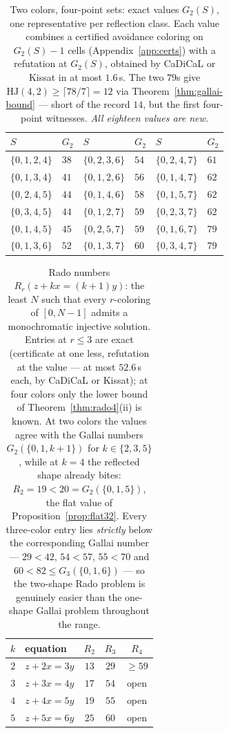 \documentclass[12pt]{article}
\newcommand{\HJ}{\mathrm{HJ}}
\begin{document}
\begin{table}[ht]
\centering
\caption{Two colors, four-point sets: exact values $G_{2}(S)$, one
representative per reflection class. Each value combines a certified
avoidance coloring on $G_{2}(S)-1$ cells (Appendix~\ref{app:certs})
with a refutation at $G_{2}(S)$, obtained by CaDiCaL or Kissat in at
most $1.6$\,s. The two $79$s give
$\HJ(4,2)\ge\lceil 78/7\rceil=12$ via
Theorem~\ref{thm:gallai-bound} --- short of the record $14$, but the
first four-point witnesses. \emph{All eighteen values are new.}}
\label{tab:sat-g2}
\begin{tabular}{@{}ll@{\qquad}ll@{\qquad}ll@{}}
\toprule
$S$ & $G_{2}$ & $S$ & $G_{2}$ & $S$ & $G_{2}$\\
\midrule
$\{0,1,2,4\}$ & $38$ & $\{0,2,3,6\}$ & $54$ & $\{0,2,4,7\}$ & $61$\\
$\{0,1,3,4\}$ & $41$ & $\{0,1,2,6\}$ & $56$ & $\{0,1,4,7\}$ & $62$\\
$\{0,2,4,5\}$ & $44$ & $\{0,1,4,6\}$ & $58$ & $\{0,1,5,7\}$ & $62$\\
$\{0,3,4,5\}$ & $44$ & $\{0,1,2,7\}$ & $59$ & $\{0,2,3,7\}$ & $62$\\
$\{0,1,4,5\}$ & $45$ & $\{0,2,5,7\}$ & $59$ & $\{0,1,6,7\}$ & $79$\\
$\{0,1,3,6\}$ & $52$ & $\{0,1,3,7\}$ & $60$ & $\{0,3,4,7\}$ & $79$\\
\bottomrule
\end{tabular}
\end{table}

\begin{table}[ht]
\centering
\caption{Rado numbers $R_{r}(z+kx=(k+1)y)$: the least $N$ such that
every $r$-coloring of $[0,N-1]$ admits a monochromatic injective
solution. Entries at $r\le 3$ are exact (certificate at one less,
refutation at the value --- at most $52.6$\,s each, by CaDiCaL or
Kissat); at four colors only the lower bound of
Theorem~\ref{thm:rado4}(ii) is known. At two colors the values agree with the
Gallai numbers $G_{2}(\{0,1,k+1\})$
\cite{BrownLandmanMishna1997,KimRho2012} for $k\in\{2,3,5\}$, while
at $k=4$ the reflected shape already bites:
$R_{2}=19<20=G_{2}(\{0,1,5\})$, the flat value of
Proposition~\ref{prop:flat32}. Every three-color entry lies
\emph{strictly} below the corresponding Gallai number --- $29<42$,
$54<57$, $55<70$ and $60<82\le G_{3}(\{0,1,6\})$ --- so the
two-shape Rado problem is genuinely easier than the one-shape Gallai
problem throughout the range.}
\label{tab:sat-rado}
\begin{tabular}{@{}clccc@{}}
\toprule
$k$ & equation & $R_{2}$ & $R_{3}$ & $R_{4}$\\
\midrule
$2$ & $z+2x=3y$ & $13$ & $29$ & $\ge 59$\\
$3$ & $z+3x=4y$ & $17$ & $54$ & open\\
$4$ & $z+4x=5y$ & $19$ & $55$ & open\\
$5$ & $z+5x=6y$ & $25$ & $60$ & open\\
\bottomrule
\end{tabular}
\end{table}
\end{document}
